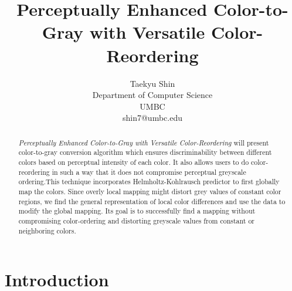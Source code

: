 \documentclass{article}
\title{Perceptually Enhanced Color-to-Gray with Versatile Color-Reordering}
\author{Taekyu Shin\\
Department of Computer Science\\
UMBC \\
shin7@umbc.edu}
\begin{document}
\maketitle

\begin{abstract}
  {\it Perceptually Enhanced Color-to-Gray with Versatile Color-Reordering} will present color-to-gray conversion algorithm which ensures discriminability between different colors based on perceptual intensity of each color. It also allows users to do color-reordering in such a way that it does not compromise perceptual greyscale ordering.This technique incorporates Helmholtz-Kohlrausch predictor to first globally map the colors. Since overly local mapping might distort grey values of constant color regions, we find the general representation of local color differences and use the data to modify the global mapping. Its goal is to successfully find a mapping without compromising color-ordering and distorting greyscale values from constant or neighboring colors.
\end{abstract}

\section{Introduction}
\end{document}
